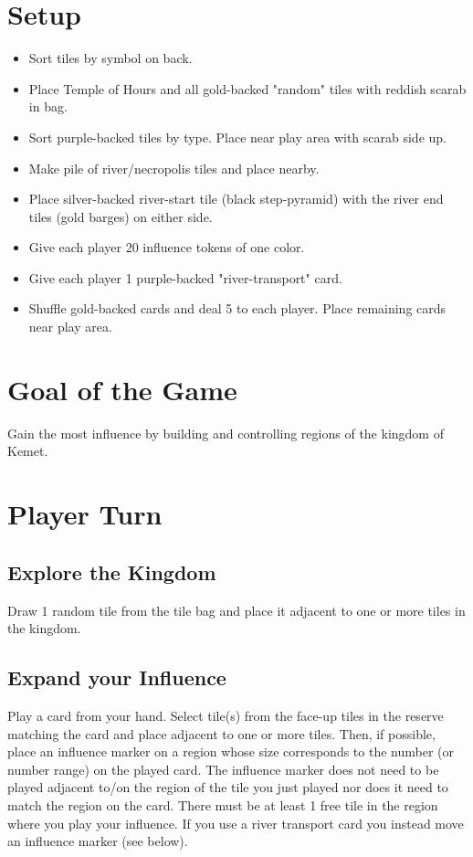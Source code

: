 \documentclass[12pt]{article}
\newenvironment{itemizeCustom}
{\begin{itemize}
  \setlength{\itemsep}{1pt}
  \setlength{\parskip}{0pt}
  \setlength{\parsep}{0pt}}
{\end{itemize}}
\begin{document}
\begin{multicols*}{2}

\section*{Setup}
\begin{itemizeCustom}
    \item Sort tiles by symbol on back.
    \item Place Temple of Hours and all gold-backed "random" tiles with reddish scarab in bag.
    \item Sort purple-backed tiles by type. Place near play area with scarab side up.
    \item Make pile of river/necropolis tiles and place nearby.
    \item Place silver-backed river-start tile (black step-pyramid) with the river end tiles (gold barges) on either side.
    \item Give each player 20 influence tokens of one color.
    \item Give each player 1 purple-backed "river-transport" card.
    \item Shuffle gold-backed cards and deal 5 to each player. Place remaining cards near play area.
\end{itemizeCustom}

\section*{Goal of the Game}
Gain the most influence by building and controlling regions of the kingdom of Kemet.

\section*{Player Turn}
\subsection*{Explore the Kingdom}
Draw 1 random tile from the tile bag and place it adjacent to one or more tiles in the kingdom.

\subsection*{Expand your Influence}
Play a card from your hand. Select tile(s) from the face-up tiles in the reserve matching the card and place adjacent to one or more tiles. Then, if possible, place an influence marker on a region whose size corresponds to the number (or number range) on the played card. The influence marker does not need to be played adjacent to/on the region of the tile you just played nor does it need to match the region on the card. There must be at least 1 free tile in the region where you play your influence. If you use a river transport card you instead move an influence marker (see below).


\end{multicols*}
\end{document}
